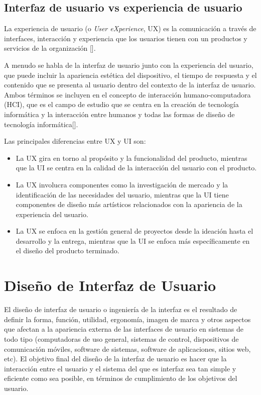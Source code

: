 \subsection{Interfaz de usuario vs experiencia de usuario}

La experiencia de usuario (o \textit{User eXperience}, UX) es la comunicación a través de interfaces, interacción y experiencia que los usuarios tienen con un productos y servicios de la organización [\cite{44}].

A menudo se habla de la interfaz de usuario junto con la experiencia del usuario, que puede incluir la apariencia estética del dispositivo, el tiempo de respuesta y el contenido que se presenta al usuario dentro del contexto de la interfaz de usuario. Ambos términos se incluyen en el concepto de interacción humano-computadora (HCI), que es el campo de estudio que se centra en la creación de tecnología informática y la interacción entre humanos y todas las formas de diseño de tecnología informática[\cite{28}].

Las principales diferencias entre UX y UI son:

\begin{itemize}
\item La UX gira en torno al propósito y la funcionalidad del producto, mientras que la UI se centra en la calidad de la interacción del usuario con el producto.
\item La UX involucra componentes como la investigación de mercado y la identificación de las necesidades del usuario, mientras que la UI tiene componentes de diseño más artísticos relacionados con la apariencia de la experiencia del usuario.
\item La UX se enfoca en la gestión general de proyectos desde la ideación hasta el desarrollo y la entrega, mientras que la UI se enfoca más específicamente en el diseño del producto terminado.
\end{itemize}

\section{Dise\~no de Interfaz de Usuario}

El diseño de interfaz de usuario o ingeniería de la interfaz es el resultado de definir la forma, función, utilidad, ergonomía, imagen de marca y otros aspectos que afectan a la apariencia externa de las interfaces de usuario en sistemas de todo tipo (computadoras de uso general, sistemas de control, dispositivos de comunicación móviles, software de sistemas, software de aplicaciones, sitios web, etc). El objetivo final del diseño de la interfaz de usuario es hacer que la interacción entre el usuario y el sistema del que es interfaz sea tan simple y eficiente como sea posible, en términos de cumplimiento de los objetivos del usuario.

